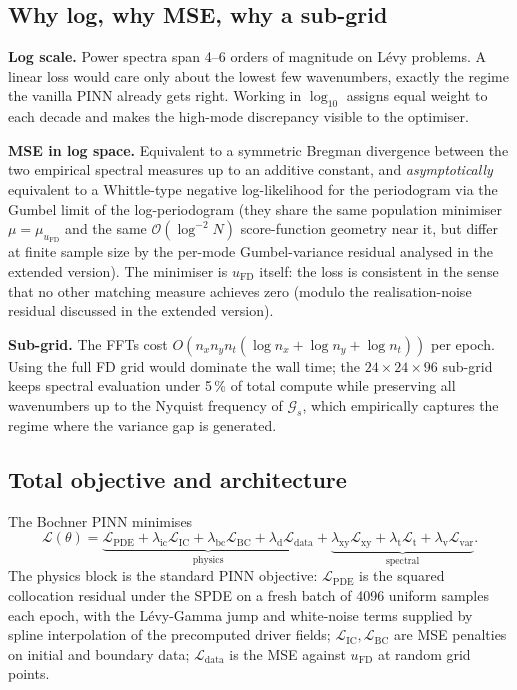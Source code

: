 \documentclass[10pt]{elsarticle}
\begin{document}
\subsection{Why log, why MSE, why a sub-grid}

\textbf{Log scale.} Power spectra span 4--6 orders of magnitude on
L\'evy problems. A linear loss would care only about the lowest few
wavenumbers, exactly the regime the vanilla PINN already gets
right. Working in \(\log_{10}\) assigns equal weight to each decade
and makes the high-mode discrepancy visible to the optimiser.

\textbf{MSE in log space.} Equivalent to a symmetric Bregman
divergence between the two empirical spectral measures up to an
additive constant, and \emph{asymptotically} equivalent to a
Whittle-type negative log-likelihood for the periodogram via the
Gumbel limit of the log-periodogram
\cite{Whittle1953,Dahlhaus1996,Brillinger1981} (they share the same
population minimiser \(\mu = \mu_{u_{\mathrm{FD}}}\) and the same
\(\mathcal O(\log^{-2} N)\) score-function geometry near it, but
differ at finite sample size by the per-mode Gumbel-variance residual
analysed in the extended version).
The minimiser is \(u_{\mathrm{FD}}\) itself: the loss is consistent
in the sense that no other matching measure achieves zero (modulo
the realisation-noise residual discussed in
the extended version).

\textbf{Sub-grid.} The FFTs cost
\(O(n_x n_y n_t (\log n_x + \log n_y + \log n_t))\) per epoch.
Using the full FD grid would dominate the wall time; the
\(24 \times 24 \times 96\) sub-grid keeps spectral evaluation under
5\,\% of total compute while preserving all wavenumbers up to the
Nyquist frequency of \(\mathcal{G}_s\), which empirically captures
the regime where the variance gap is generated.

\subsection{Total objective and architecture}
\label{subsec:total-objective}

The Bochner PINN minimises
\begin{equation}
\mathcal{L}(\theta) =
\underbrace{\mathcal L_{\mathrm{PDE}}
+ \lambda_{\mathrm{ic}} \mathcal L_{\mathrm{IC}}
+ \lambda_{\mathrm{bc}} \mathcal L_{\mathrm{BC}}
+ \lambda_{\mathrm d} \mathcal L_{\mathrm{data}}}_{\text{physics}}
+ \underbrace{\lambda_{\mathrm{xy}} \mathcal L_{\mathrm{xy}}
+ \lambda_{\mathrm t} \mathcal L_{\mathrm t}
+ \lambda_{\mathrm v} \mathcal L_{\mathrm{var}}}_{\text{spectral}}.
\label{eq:total-loss}
\end{equation}
The physics block is the standard PINN objective:
\(\mathcal L_{\mathrm{PDE}}\) is the squared collocation residual
under the SPDE on a fresh batch of 4096 uniform samples each epoch,
with the L\'evy-Gamma jump and white-noise terms supplied by spline
interpolation of the precomputed driver fields;
\(\mathcal L_{\mathrm{IC}}, \mathcal L_{\mathrm{BC}}\) are MSE
penalties on initial and boundary data; \(\mathcal L_{\mathrm{data}}\)
is the MSE against \(u_{\mathrm{FD}}\) at random grid points.
\end{document}

